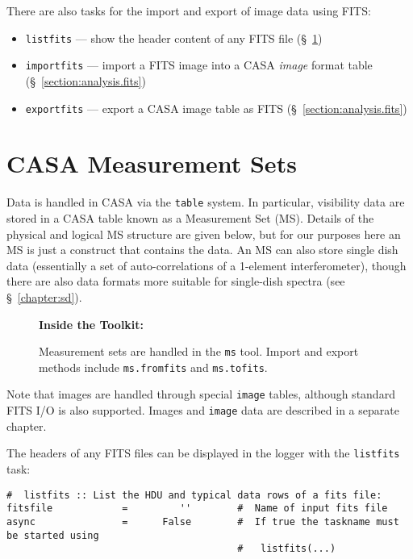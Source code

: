There are also tasks for the import and export of image data using
FITS:
\begin{itemize}
   \item {\tt listfits} --- show the header content of any FITS file
         (\S~\ref{section:io.ms})
   \item {\tt importfits} --- import a FITS image into a CASA  
         {\it image} format table 
         (\S~\ref{section:analysis.fits})
   \item {\tt exportfits} --- export a CASA image table as FITS 
         (\S~\ref{section:analysis.fits})
\end{itemize}

\section{CASA Measurement Sets}
\label{section:io.ms}

Data is handled in CASA via the {\tt table} system.  In particular,
visibility data are stored in a CASA table known as a Measurement Set
(MS).  Details of the physical and logical MS structure are given
below, but for our purposes here an MS is just a construct that
contains the data.  An MS can also store single dish data (essentially
a set of auto-correlations of a 1-element interferometer), though
there are also data formats more suitable for single-dish spectra (see
\S~\ref{chapter:sd}).

\begin{wrapfigure}{r}{2.5in}
  \begin{boxedminipage}{2.5in}
     \centerline{\bf Inside the Toolkit:}
     Measurement sets are handled in the {\tt ms} tool.
     Import and export methods include {\tt ms.fromfits} and
     {\tt ms.tofits}.
  \end{boxedminipage}
\end{wrapfigure}

Note that images are handled through special
{\tt image} tables, although standard FITS I/O is also supported.
Images and {\tt image} data are described in a separate chapter.

The headers of any FITS files can be displayed in the logger with the
{\tt listfits} task:

\small
\begin{verbatim}
#  listfits :: List the HDU and typical data rows of a fits file:
fitsfile            =         ''        #  Name of input fits file
async               =      False        #  If true the taskname must be started using
                                        #   listfits(...)
\end{verbatim}
\normalsize

